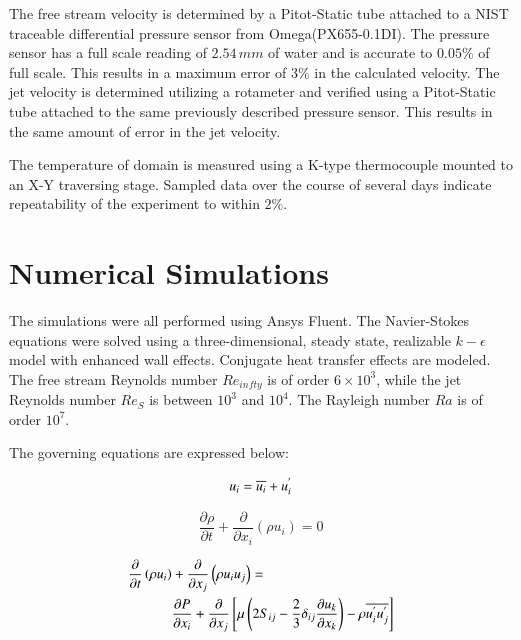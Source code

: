 \documentclass[preprint,12pt]{elsarticle}
\begin{document}
The free stream velocity is determined by a Pitot-Static tube attached to a NIST traceable differential pressure sensor from Omega(PX655-0.1DI).  The pressure sensor has a full scale reading of $2.54\,mm$ of water and is accurate to $0.05\%$ of full scale.  This results in a maximum error of $3\%$ in the calculated velocity.  The jet velocity is determined utilizing a rotameter and verified using a Pitot-Static tube attached to the same previously described pressure sensor.  This results in the same amount of error in the jet velocity.

The temperature of domain is measured using a K-type thermocouple mounted to an X-Y traversing stage.  Sampled data over the course of several days indicate repeatability of the experiment to within $2\%$.

\section{Numerical Simulations}
The simulations were all performed using Ansys Fluent\cite{fluentsoftware}.  The Navier-Stokes equations were solved using a three-dimensional, steady state, realizable $k-\epsilon$ model with enhanced wall effects.  Conjugate heat transfer effects are modeled.  The free stream Reynolds number $Re_{infty}$ is of order $6\times10^3$, while the jet Reynolds number $Re_S$ is between $10^3$ and $10^4$.  The Rayleigh number $Ra$ is of order $10^7$.

The governing equations are expressed below:

\begin{equation}
\centering
u_i = \overline{u_i} + u^{'}_{i}
\label{eq:veldecomp}
\end{equation}

\begin{equation}
\frac{\partial \rho }{\partial t } + \frac{\partial }{\partial x_i} \left( \rho u_i \right) = 0 
\label{eq:mass}
\end{equation}

\begin{equation}
\centering
\begin{split}
\frac{\partial }{\partial t} \left( \rho u_i \right) &+ \frac{\partial }{\partial x_j } \left( \rho u_i u_j \right) = \\
 &\frac{\partial P}{\partial x_i } + \frac{\partial }{\partial x_j } \left[ \mu \left( 2 S_{ij} - \frac{2}{3} \delta_{ij} \frac{\partial u_k }{\partial x_k } \right) - \rho \overline{u^{'}_{i} u^{'}_{j}} \right] 
\label{eq:momentum}
\end{split}
\end{equation}
\end{document}
